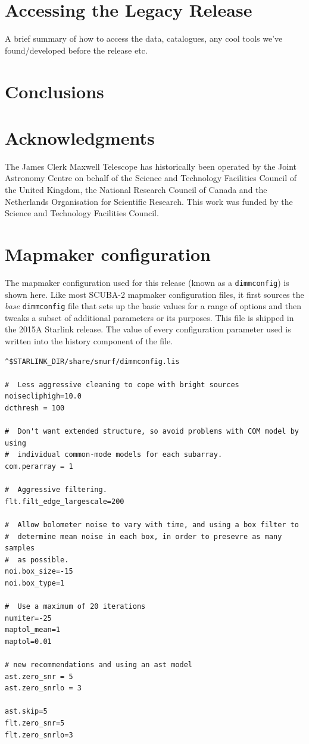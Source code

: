 \documentclass[usenatbib]{mn2e}
\begin{document}
\section{Accessing the Legacy Release}
A brief summary of how to access the data, catalogues, any cool tools
we've found/developed before the release etc.

\section{Conclusions}

\section*{Acknowledgments}

The James Clerk Maxwell Telescope has historically been operated by
the Joint Astronomy Centre on behalf of the Science and Technology
Facilities Council of the United Kingdom, the National Research
Council of Canada and the Netherlands Organisation for Scientific
Research. This work was funded by the Science and Technology Facilities
Council.




\appendix
\onecolumn

\section{Mapmaker configuration}
The mapmaker configuration used for this release (known as a
\texttt{dimmconfig}) is shown here. Like most SCUBA-2 mapmaker
configuration files, it first sources the \emph{base}
\texttt{dimmconfig} file that sets up the basic values for a range of
options and then tweaks a subset of additional parameters or its
purposes. This file is shipped in the 2015A Starlink release. The
value of every configuration parameter used is written into the
history component of the file.

\begin{verbatim}
^$STARLINK_DIR/share/smurf/dimmconfig.lis

#  Less aggressive cleaning to cope with bright sources
noisecliphigh=10.0
dcthresh = 100

#  Don't want extended structure, so avoid problems with COM model by using
#  individual common-mode models for each subarray.
com.perarray = 1

#  Aggressive filtering.
flt.filt_edge_largescale=200

#  Allow bolometer noise to vary with time, and using a box filter to
#  determine mean noise in each box, in order to presevre as many samples
#  as possible.
noi.box_size=-15
noi.box_type=1

#  Use a maximum of 20 iterations
numiter=-25
maptol_mean=1
maptol=0.01

# new recommendations and using an ast model
ast.zero_snr = 5
ast.zero_snrlo = 3

ast.skip=5
flt.zero_snr=5
flt.zero_snrlo=3
\end{verbatim}


\label{lastpage}
\bsp
\end{document}
